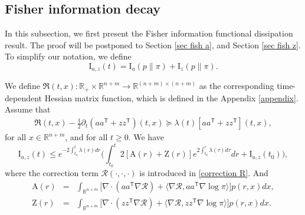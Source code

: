 \documentclass[11pt,reqno]{amsart}
\newcommand{\la}{\langle}
\newcommand{\ra}{\rangle}
\newcommand{\ts}{\mathsf{T}}
\newcommand{\bea}{\begin{eqnarray}}
\newcommand{\eea}{\end{eqnarray}}
\newcommand{\beaa}{\begin{eqnarray*}}
\newcommand{\eeaa}{\end{eqnarray*}}
\def\pa{\partial}
\begin{document}
\subsection{Fisher information decay}
In this subsection, we first present the Fisher information functional dissipation result. The proof will be postponed to Section \ref{sec fish a}, and Section \ref{sec fish z}. To simplify our notation, we define 
\begin{equation}
    \mathrm I_{a,z}(t)= \mathrm{I}_a(p\|\pi)+\mathrm{I}_z(p\|\pi).
\end{equation}
\begin{theorem}\label{thm: Fisher information decay az}
We define $\mathfrak{R}(t,x):\mathbb R_+\times  \mathbb R^{n+m}\rightarrow \mathbb{R}^{(n+m)\times (n+m)}$ as the corresponding time-dependent Hessian matrix function, which is defined in the Appendix \ref{appendix}. Assume that 
	\bea\label{assumption: a z tensor}
	\mathfrak R(t,x)-\frac{1}{2}\pa_t(aa^{\ts}+zz^{\ts})(t,x)\succeq \lambda(t) [aa^{\ts}+zz^{\ts}](t,x),
	\eea 
	for all $x\in\mathbb R^{n+m}$, and for all $t\ge 0$.
	We have 
	\begin{equation*}
    \mathrm I_{a,z}(t)\leq  e^{-2\int_{t_0}^t \lambda(r)dr}\Big(\int_{t_0}^t 2[\mathrm A(r)+\mathrm Z(r)]e^{2\int_{t_0}^r\lambda(\tau)d\tau} dr+\mathrm I_{a,z}(t_0)\Big),
\end{equation*}
where the correction term $\mathcal R(\cdot,\cdot,\cdot)$ is introduced in \eqref{correction R}. And
\beaa
\mathrm A(r) &=& \int_{\mathbb R^{n+m}}\big[
\nabla\cdot(aa^{\ts}\nabla\mathcal{R})+ \la \nabla \mathcal R, aa^{\ts}\nabla\log\pi\ra \big]{p} (r,x) dx,\\
\mathrm Z(r) &=&\int_{\mathbb R^{n+m}}\big[
\nabla\cdot(zz^{\ts}\nabla\mathcal{R})+\la \nabla \mathcal R, zz^{\ts}\nabla\log\pi\ra \big]{p} (r,x) dx.
\eeaa

\end{theorem}
\end{document}
